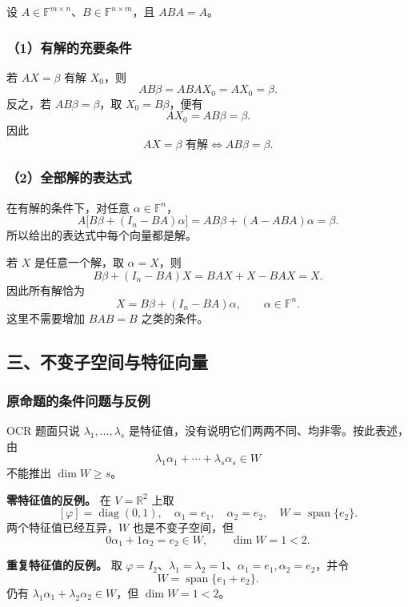 \documentclass[11pt,fontset=fandol]{ctexart}
\begin{document}
设 \(A\in\mathbb F^{m\times n}\)、\(B\in\mathbb F^{n\times m}\)，且
\(ABA=A\)。

\subsubsection{（1）有解的充要条件}\label{ux6709ux89e3ux7684ux5145ux8981ux6761ux4ef6}

若 \(AX=\beta\) 有解 \(X_0\)，则 \[
AB\beta=ABAX_0=AX_0=\beta.
\] 反之，若 \(AB\beta=\beta\)，取 \(X_0=B\beta\)，便有 \[
AX_0=AB\beta=\beta.
\] 因此 \[
\boxed{AX=\beta\text{ 有解}\iff AB\beta=\beta.}
\]

\subsubsection{（2）全部解的表达式}\label{ux5168ux90e8ux89e3ux7684ux8868ux8fbeux5f0f}

在有解的条件下，对任意 \(\alpha\in\mathbb F^n\)， \[
A\bigl[B\beta+(I_n-BA)\alpha\bigr]
=AB\beta+(A-ABA)\alpha=\beta.
\] 所以给出的表达式中每个向量都是解。

若 \(X\) 是任意一个解，取 \(\alpha=X\)，则 \[
B\beta+(I_n-BA)X
=BAX+X-BAX=X.
\] 因此所有解恰为 \[
\boxed{X=B\beta+(I_n-BA)\alpha,\qquad\alpha\in\mathbb F^n.}
\] 这里不需要增加 \(BAB=B\) 之类的条件。

\subsection{三、不变子空间与特征向量}\label{ux4e09ux4e0dux53d8ux5b50ux7a7aux95f4ux4e0eux7279ux5f81ux5411ux91cf}

\subsubsection{原命题的条件问题与反例}\label{ux539fux547dux9898ux7684ux6761ux4ef6ux95eeux9898ux4e0eux53cdux4f8b}

OCR 题面只说 \(\lambda_1,\ldots,\lambda_s\)
是特征值，没有说明它们两两不同、均非零。按此表述，由 \[
\lambda_1\alpha_1+\cdots+\lambda_s\alpha_s\in W
\] 不能推出 \(\dim W\geq s\)。

\textbf{零特征值的反例。} 在 \(V=\mathbb R^2\) 上取 \[
[\varphi]=\operatorname{diag}(0,1),\quad
\alpha_1=e_1,\quad\alpha_2=e_2,\quad W=\operatorname{span}\{e_2\}.
\] 两个特征值已经互异，\(W\) 也是不变子空间，但 \[
0\alpha_1+1\alpha_2=e_2\in W,\qquad\dim W=1<2.
\]

\textbf{重复特征值的反例。} 取
\(\varphi=I_2\)、\(\lambda_1=\lambda_2=1\)、\(\alpha_1=e_1,\alpha_2=e_2\)，并令
\[
W=\operatorname{span}\{e_1+e_2\}.
\] 仍有 \(\lambda_1\alpha_1+\lambda_2\alpha_2\in W\)，但
\(\dim W=1<2\)。
\end{document}

